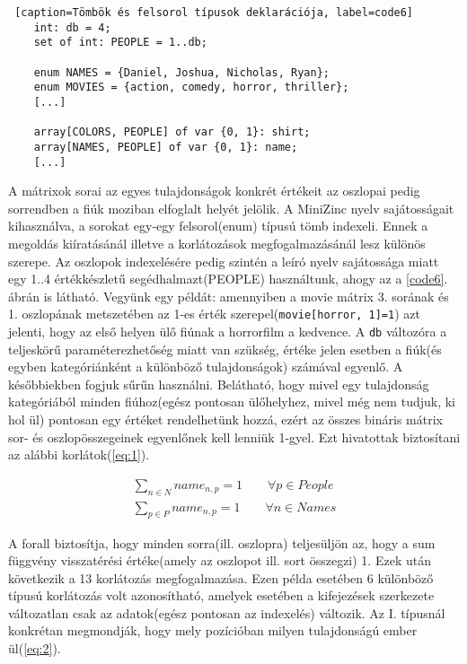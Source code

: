 \documentclass[12pt,a4paper]{report}
\begin{document}
    \begin{lstlisting} [caption=Tömbök és felsorol típusok deklarációja, label=code6]
    int: db = 4;
    set of int: PEOPLE = 1..db;
    
    enum NAMES = {Daniel, Joshua, Nicholas, Ryan};
    enum MOVIES = {action, comedy, horror, thriller};
    [...]
    
    array[COLORS, PEOPLE] of var {0, 1}: shirt;
    array[NAMES, PEOPLE] of var {0, 1}: name;
    [...]\end{lstlisting}

    A mátrixok sorai az egyes tulajdonságok konkrét értékeit az oszlopai pedig sorrendben a fiúk moziban elfoglalt helyét jelölik.
    A MiniZinc nyelv sajátosságait kihasználva, a sorokat egy-egy felsorol(enum) típusú tömb indexeli.
    Ennek a megoldás kiíratásánál illetve a korlátozások megfogalmazásánál lesz különös szerepe.
    Az oszlopok indexelésére pedig szintén a leíró nyelv sajátossága miatt egy {1..4} értékkészletű segédhalmazt(PEOPLE) használtunk, ahogy az a \ref{code6}. ábrán is látható.
    Vegyünk egy példát: amennyiben a movie mátrix 3. sorának és 1. oszlopának metszetében az 1-es érték szerepel(\texttt{movie[horror, 1]=1}) azt jelenti, hogy az első helyen ülő fiúnak a horrorfilm a kedvence.
    A \texttt{db} változóra a teljeskörű paraméterezhetőség miatt van szükség, értéke jelen esetben a fiúk(és egyben kategóriánként a különböző tulajdonságok) számával egyenlő. A későbbiekben fogjuk sűrűn használni.
    Belátható, hogy mivel egy tulajdonság kategóriából minden fiúhoz(egész pontosan ülőhelyhez, mivel még nem tudjuk, ki hol ül) pontosan egy értéket rendelhetünk hozzá, ezért az összes bináris mátrix sor- és oszlopösszegeinek egyenlőnek kell lenniük 1-gyel.
    Ezt hivatottak biztosítani az alábbi korlátok(\ref{eq:1}).

    \begin{equation} \label{eq:1}
    \begin{aligned}
    \sum_{n\in N} name_{n,p} =1 \qquad \forall p \in People \\
    \sum_{p\in P} name_{n,p} =1 \qquad \forall n \in Names
    \end{aligned}
    \end{equation}

    A forall biztosítja, hogy minden sorra(ill. oszlopra) teljesüljön az, hogy a sum függvény visszatérési értéke(amely az oszlopot ill. sort összegzi) 1.
    Ezek után következik a 13 korlátozás megfogalmazása.
    Ezen példa esetében 6 különböző típusú korlátozás volt azonosítható, amelyek esetében a kifejezések szerkezete változatlan csak az adatok(egész pontosan az indexelés) változik.
    Az I. típusnál konkrétan megmondják, hogy mely pozícióban milyen tulajdonságú ember ül(\ref{eq:2}).
\end{document}
